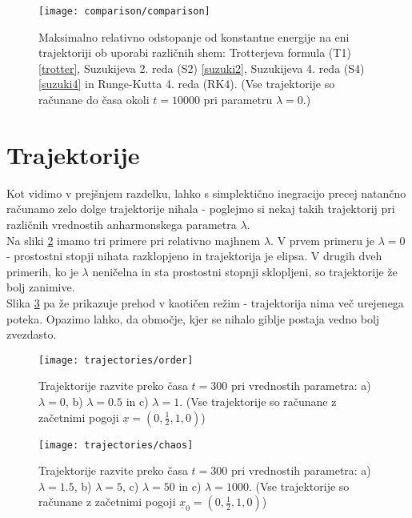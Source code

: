 \documentclass[a4paper]{article}
\newcommand{\half}{\frac{1}{2}}
\newcommand{\x}{\underline{x}}
\begin{document}
    \begin{figure}
        \centering
        \texttt{[image: comparison/comparison]}
        \caption{Maksimalno relativno odstopanje od konstantne energije na eni trajektoriji ob uporabi različnih shem: 
        Trotterjeva formula (T1) \ref{trotter},
        Suzukijeva 2. reda (S2) \ref{suzuki2},
        Suzukijeva 4. reda (S4) \ref{suzuki4} in 
        Runge-Kutta 4. reda (RK4).
        (Vse trajektorije so računane do časa okoli $t = 10000$ pri parametru $\lambda = 0$.)}
        \label{comparison}
    \end{figure}

    \section{Trajektorije}

    Kot vidimo v prejšnjem razdelku, lahko s simplektično inegracijo precej natančno računamo zelo dolge trajektorije nihala - poglejmo si nekaj
    takih trajektorij pri različnih vrednostih anharmonskega parametra $\lambda$.\\
    Na sliki \ref{order} imamo tri primere pri relativno majhnem $\lambda$. V prvem primeru je $\lambda = 0$ - prostostni stopji nihata
    razklopjeno in trajektorija je elipsa. V drugih dveh primerih, ko je $\lambda$ neničelna in sta prostostni stopnji sklopljeni, so trajektorije
    že bolj zanimive.\\
    Slika \ref{chaos} pa že prikazuje prehod v kaotičen režim - trajektorija nima več urejenega poteka. Opazimo lahko, da območje, kjer se
    nihalo giblje postaja vedno bolj zvezdasto.
    
    \begin{figure}
        \centering
        \texttt{[image: trajectories/order]}
        \caption{Trajektorije razvite preko časa $t = 300$ pri vrednostih parametra:
        a) $\lambda = 0$,
        b) $\lambda = 0.5$ in
        c) $\lambda = 1$.
        (Vse trajektorije so računane z začetnimi pogoji $\x = (0, \half, 1, 0)$)}
        \label{order}
    \end{figure}
    
    \begin{figure}
        \centering
        \texttt{[image: trajectories/chaos]}
        \caption{Trajektorije razvite preko časa $t = 300$ pri vrednostih parametra:
        a) $\lambda = 1.5$,
        b) $\lambda = 5$,
        c) $\lambda = 50$ in
        c) $\lambda = 1000$.
        (Vse trajektorije so računane z začetnimi pogoji $\x_0 = (0, \half, 1, 0)$)}
        \label{chaos}
    \end{figure}
\end{document}
